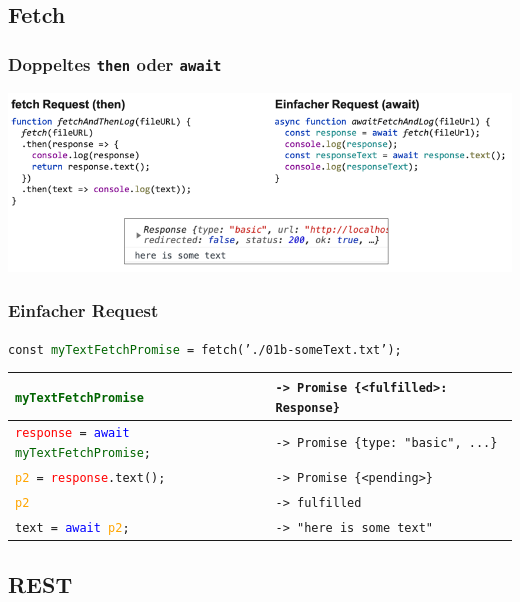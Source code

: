 \documentclass[a4paper, landscape, 8pt]{scrartcl}
\begin{document}
\begin{multicols*}{4}
        \subsection{Fetch}

        \subsubsection{Doppeltes \texttt{then} oder \texttt{await}}
        \includegraphics[width=\columnwidth]{graphic/24-double-await-or-then}

        \subsubsection{Einfacher Request}
        \texttt{const \textcolor{darkgreen}{myTextFetchPromise} = fetch('./01b-someText.txt');} \\
        \begin{tabularx}{\columnwidth}{| X | X |}
            \hline
            \texttt{\textcolor{darkgreen}{myTextFetchPromise}} & \texttt{-> Promise \{<fulfilled>: Response\}} \\
            \hline
            \texttt{\textcolor{red}{response} = \textcolor{blue}{await} \textcolor{darkgreen}{myTextFetchPromise};} & \texttt{-> Promise \{type: "basic", ...\}} \\
            \hline
            \texttt{\textcolor{orange}{p2} = \textcolor{red}{response}.text();} & \texttt{-> Promise \{<pending>\}} \\
            \hline
            \texttt{\textcolor{orange}{p2}} & \texttt{-> fulfilled} \\
            \hline
            \texttt{text = \textcolor{blue}{await} \textcolor{orange}{p2};} & \texttt{-> "here is some text"} \\
            \hline
        \end{tabularx}

        \subsection{REST}

\end{multicols*}
\end{document}
